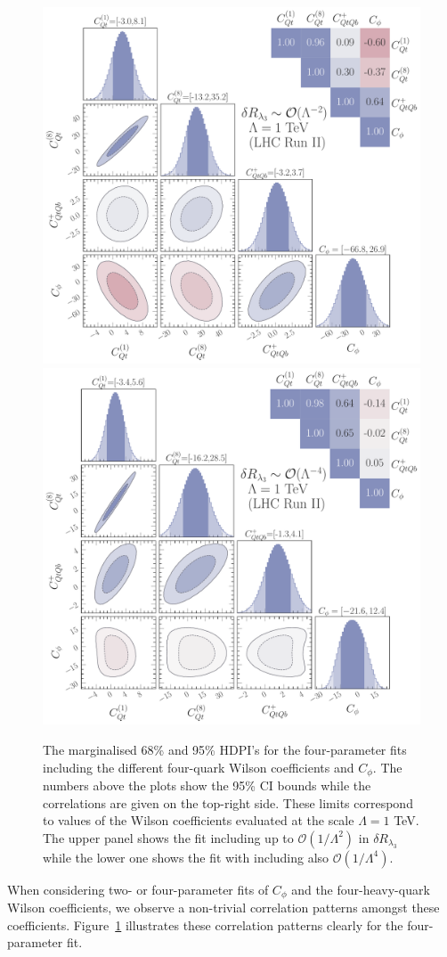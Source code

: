 \begin{figure}[h!]
	\begin{center}
		\includegraphics[width=.6\linewidth]{fig/4param_fit_LHC_RunII_l3L_rge}\\
		\includegraphics[width=.6\linewidth]{fig/4param_fit_LHC_RunII_l3Q_rge}
	\end{center}
	\caption{The marginalised 68\% and 95\% HDPI's for the four-parameter fits including the different four-quark Wilson coefficients and $C_\phi$. The numbers above the plots show the 95\% CI bounds while the correlations are given on the top-right side. 
		These limits correspond to values of the Wilson coefficients evaluated at the scale $\Lambda=1$ TeV. 
		The upper panel shows the fit including up to $\mathcal{O}(1/\Lambda^2)$ in $\delta R_{\lambda_3}$  while the lower one shows the fit with including also  $\mathcal{O}(1/\Lambda^4)$.  \label{fig:4param} }
\end{figure}
%
When considering two- or four-parameter fits of $C_\phi$ and the four-heavy-quark Wilson coefficients, we observe a non-trivial correlation patterns amongst these coefficients.  Figure~\ref{fig:4param} illustrates these correlation patterns clearly for the four-parameter fit. 
